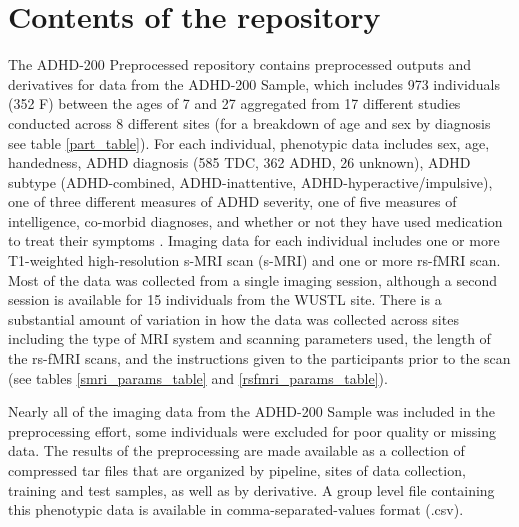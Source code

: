 \documentclass[preprint,12pt,3p]{elsarticle}
\begin{document}
\section{Contents of the repository}

The ADHD-200 Preprocessed repository contains preprocessed outputs and derivatives for data from the ADHD-200 Sample, which includes 973 individuals (352 F) between the ages of 7 and 27 aggregated from 17 different studies conducted across 8 different sites (for a breakdown of age and sex by diagnosis see table \ref{part_table}). For each individual, phenotypic data includes sex, age, handedness, ADHD diagnosis (585 TDC, 362 ADHD, 26 unknown), ADHD subtype (ADHD-combined, ADHD-inattentive, ADHD-hyperactive/impulsive), one of three different measures of ADHD severity, one of five measures of intelligence, co-morbid diagnoses, and whether or not they have used medication to treat their symptoms \cite{Milham2012}. Imaging data for each individual includes one or more T1-weighted high-resolution s-MRI scan (s-MRI) and one or more rs-fMRI scan. Most of the data was collected from a single imaging session, although a second session is available for 15 individuals from the WUSTL site. There is a substantial amount of variation in how the data was collected across sites including the type of MRI system and scanning parameters used, the length of the rs-fMRI scans, and the instructions given to the participants prior to the scan (see tables \ref{smri_params_table} and \ref{rsfmri_params_table}). 

Nearly all of the imaging data from the ADHD-200 Sample was included in the preprocessing effort, some individuals were excluded for poor quality or missing data. The results of the preprocessing are made available as a collection of compressed tar files that are organized by pipeline, sites of data collection, training and test samples, as well as by derivative. A group level file containing this phenotypic data is available in comma-separated-values format (.csv). 

\end{document}
